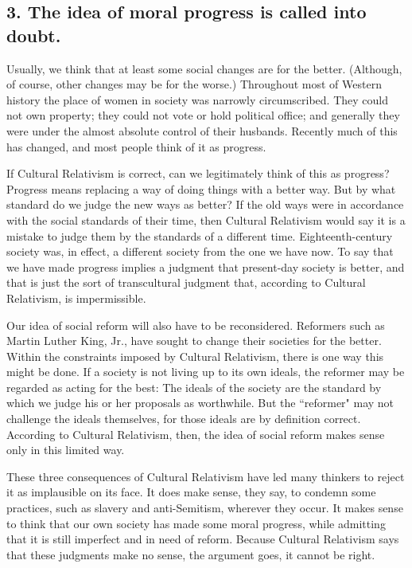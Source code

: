 \subsection{3. The idea of moral progress is called into doubt.}
Usually, we think that at  least  some  social  changes  are  for  the  better.  (Although,  of  course, 
other  changes  may  be  for  the  worse.)  Throughout  most  of  Western 
history the place of women in society was narrowly circumscribed. They 
could  not  own  property;  they  could  not  vote  or  hold  political  office;  and 
generally they were under the almost absolute control of their husbands. 
Recently  much  of  this  has  changed,  and  most  people  think  of  it  as 
progress.

If  Cultural  Relativism  is  correct,  can  we  legitimately  think  of  this  as 
progress? Progress means replacing a way of doing things with a better 
way.  But  by  what  standard  do  we  judge  the  new  ways as  better?  If  the 
old ways were in accordance with the social standards of their time, then 
Cultural  Relativism  would  say  it  is  a  mistake  to  judge  them  by  the 
standards of a different time. Eighteenth-century society was, in effect, a 
different society from the one we have now. To  say that  we have made 
progress implies  a  judgment  that  present-day society  is better,  and that 
is  just  the  sort  of  transcultural  judgment  that,  according  to  Cultural 
Relativism, is impermissible. 

Our  idea  of  social  reform  will  also  have  to  be  reconsidered.  Reformers 
such as Martin Luther King, Jr., have sought to change their societies for 
the better. Within the constraints imposed by Cultural Relativism, there is 
one way this might be done. If a society is not living up to its own ideals, 
the  reformer  may  be  regarded  as  acting  for  the  best:  The  ideals  of  the 
society  are  the  standard  by  which  we  judge  his  or  her  proposals  as 
worthwhile. But the ``reformer" may not challenge the ideals themselves, 
for those ideals are by definition correct. According to Cultural 
Relativism,  then,  the  idea  of  social  reform  makes  sense  only  in  this 
limited way. 

These three consequences of Cultural Relativism have led many 
thinkers  to reject it as implausible on  its face. It does make  sense, they 
say,  to  condemn  some  practices,  such  as  slavery  and  anti-Semitism, 
wherever  they  occur.  It  makes  sense  to  think  that  our  own  society  has 
made some moral progress, while admitting that it is still imperfect and in 
need  of  reform.  Because  Cultural  Relativism says  that  these  judgments 
make no sense, the argument goes, it cannot be right. 

